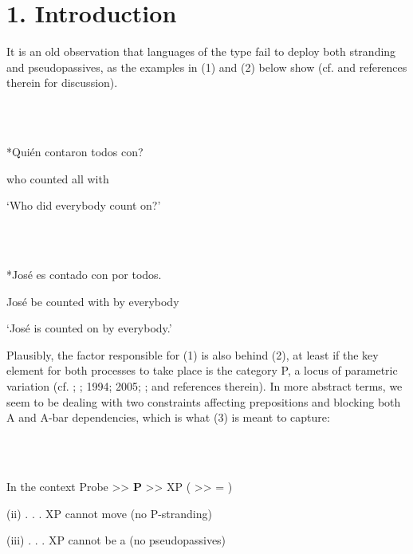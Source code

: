 \documentclass[output=paper]{langsci/langscibook}
\begin{document}
\section{ 1. Introduction}

It is an old observation that languages of the  type fail to deploy both  stranding and pseudopassives, as the examples in (1) and (2) below show (cf. \citealt{Law2006} and references therein for discussion). 

\ea%
    \label{ex:key:1}
    \gll\\
        \\
    \glt
    \z


*Quién contaron todos con?                                                  

  who    counted  all      with

           ‘Who did everybody count on?’

\ea%
    \label{ex:key:2}
    \gll\\
        \\
    \glt
    \z


*José es contado con   por todos.                                           

José be counted with by   everybody

‘José is counted on by everybody.’

\citep[741]{Campos1991}

Plausibly, the factor responsible for (1) is also behind (2), at least if the key element for both processes to take place is the category P, a locus of parametric variation (cf. \citet{Hornstein1981}; \citealt{Kayne1984}; 1994; 2005; \citealt{Abels2003}; and references therein). In more abstract terms, we seem to be dealing with two constraints affecting prepositions and blocking both A and A-bar dependencies, which is what (3) is meant to capture:

\ea%
    \label{ex:key:3}
    \gll\\
        \\
    \glt
    \z

          In the context Probe >>  \textbf{P}  >>  XP  ( >> = )

  (ii) . . . XP cannot move (no P-stranding)

  (iii) . . . XP cannot be a  (no pseudopassives)
\end{document}

